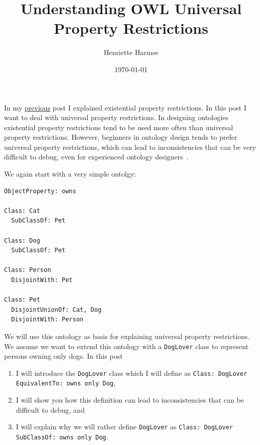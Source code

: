 \documentclass{amsart}
\title{Understanding OWL Universal Property Restrictions}
\author{Henriette Harmse}
\date{\today}
\begin{document}
  \maketitle
  
  In my \href{https://henrietteharmse.com/2018/04/26/understanding-owl-existential-property-restrictions/}{previous} post I explained existential property restrictions. In this post I want to deal with universal property restrictions. In designing ontologies existential property restrictions tend to be used more often than universal property restrictions. However, beginners in ontology design tends to prefer universal property restrictions, which can lead to inconsistencies that can be very difficult to debug, even for experienced ontology designers~\cite{Horridge2011,Horridge2013}.
  
  We again start with a very simple ontolgy:  
\begin{small}
\begin{verbatim} 
ObjectProperty: owns
        
Class: Cat
  SubClassOf: Pet
    
Class: Dog
  SubClassOf: Pet
    
Class: Person
  DisjointWith: Pet
        
Class: Pet
  DisjointUnionOf: Cat, Dog
  DisjointWith: Person   
\end{verbatim}
\end{small}  

We will use this ontology as basis for explaining universal property restrictions. We assume we want to extend this ontology with a \texttt{DogLover} class to represent persons owning only dogs. In this post
  \begin{enumerate}
   \item I will introduce the \texttt{DogLover} class which I will define as \texttt{Class: DogLover EquivalentTo: owns only Dog},
   \item I will show you how this definition can lead to inconsistencies that can be difficult to debug, and
   \item I will explain why we will rather define \texttt{DogLover} as \texttt{Class: DogLover SubClassOf: owns only Dog}.
   \end{enumerate}
\end{document}
